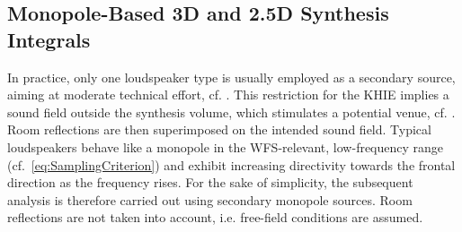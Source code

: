 \subsection{Monopole-Based 3D and 2.5D Synthesis Integrals}

In practice, only one loudspeaker type is usually employed as a secondary
source, aiming at moderate technical effort, cf. \cite{Vries1996_JAES}.
%
%
This restriction for the KHIE implies a sound field outside the synthesis volume,
which stimulates a potential venue, cf. \cite{Start1997_diss, Wittek2007_JAES,
Wittek2007_diss, Gauthier2007_Acta,Erbes2020_diss}.
Room reflections are then superimposed on the intended sound field.
%
Typical loudspeakers behave like a monopole in the WFS-relevant,
low-frequency range (cf.~\myeq\eqref{eq:SamplingCriterion}) and exhibit
increasing directivity towards the frontal direction as the frequency rises.
%
For the sake of simplicity, the subsequent analysis is therefore carried
out using secondary monopole sources.
Room reflections are not taken into account, i.e. free-field conditions
are assumed.



